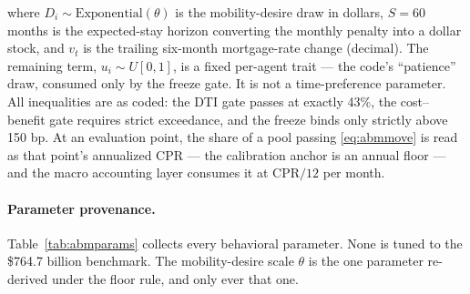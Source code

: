 \documentclass[12pt]{article}
\begin{document}
where $D_i \sim \mathrm{Exponential}(\theta)$ is the mobility-desire draw in dollars, $S = 60$ months is the expected-stay horizon converting the monthly penalty into a dollar stock, and $v_t$ is the trailing six-month mortgage-rate change (decimal). The remaining term, $u_i \sim U[0,1]$, is a fixed per-agent trait --- the code's ``patience'' draw, consumed only by the freeze gate. It is not a time-preference parameter. %
All inequalities are as coded: the DTI gate passes at exactly 43\%, the cost--benefit gate requires strict exceedance, and the freeze binds only strictly above 150 bp. At an evaluation point, the share of a pool passing \eqref{eq:abmmove} is read as that point's annualized CPR --- the calibration anchor is an annual floor --- and the macro accounting layer consumes it at $\mathrm{CPR}/12$ per month. %

\paragraph{Parameter provenance.}
Table~\ref{tab:abmparams} collects every behavioral parameter. None is tuned to the \$764.7 billion benchmark. The mobility-desire scale $\theta$ is the one parameter re-derived under the floor rule, and only ever that one.
\end{document}
